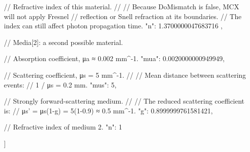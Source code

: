 {{{        // Refractive index of this material.
        //
        // Because DoMismatch is false, MCX will not apply Fresnel
        // reflection or Snell refraction at its boundaries.
        // The index can still affect photon propagation time.
        "n": 1.3700000047683716
      },

      // Media[2]: a second possible material.
      {
        // Absorption coefficient, μa ≈ 0.002 mm^-1.
        "mua": 0.0020000000949949,

        // Scattering coefficient, μs = 5 mm^-1.
        //
        // Mean distance between scattering events:
        // 1 / μs = 0.2 mm.
        "mus": 5,

        // Strongly forward-scattering medium.
        //
        // The reduced scattering coefficient is:
        // μs' = μs(1-g) = 5(1-0.9) ≈ 0.5 mm^-1.
        "g": 0.8999999761581421,

        // Refractive index of medium 2.
        "n": 1
      }
    ]
  }
}

